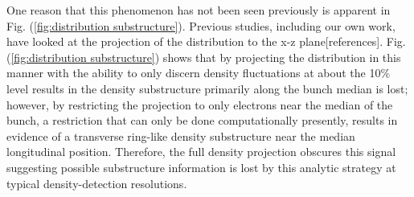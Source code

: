 \documentclass[aps,prl,twocolumn,showpacs,superscriptaddress,groupedaddress]{revtex4-1}  %
\begin{document}
{One reason that this phenomenon has not been seen previously 
is apparent in Fig. (\ref{fig:distribution substructure}).  Previous studies, including our own work,
have looked at the projection of the distribution to the x-z plane[references]. 
Fig. (\ref{fig:distribution substructure})
shows that by projecting the distribution in this manner with the ability to only discern
density fluctuations at about the 10\% level results in the density substructure primarily along the bunch
median is lost; however,
by restricting the projection to only electrons near the median of the bunch, a restriction that can only
be done computationally presently, results in evidence of a transverse ring-like density substructure near the median longitudinal 
position.  Therefore, the full density projection obscures this signal suggesting possible substructure information is lost 
by this analytic strategy at typical density-detection resolutions.  

}
\end{document}

